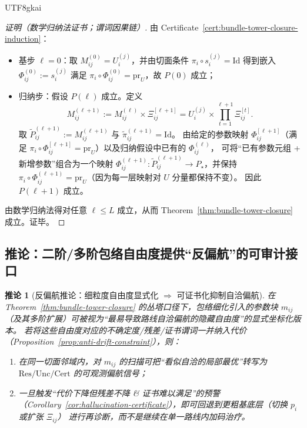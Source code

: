 \documentclass[12pt]{article}
\newtheorem{corollary}{推论}[section]
\begin{document}
\begin{CJK*}{UTF8}{gkai}
\begin{proof}[证明（数学归纳法证书；谓词因果链）]
由 Certificate~\ref{cert:bundle-tower-closure-induction}：
\begin{itemize}
  \item 基步 $\ell=0$：取 $M_{ij}^{(0)}=U_i^{(j)}$，并由切面条件 $\pi_i\circ s_i^{(j)}=\mathrm{Id}$ 得到嵌入 $\Phi_{ij}^{(0)}:=s_i^{(j)}
    $ 满足 $\pi_i\circ \Phi_{ij}^{(0)}=\mathrm{pr}_{U}$，故 $P(0)$ 成立；
  \item 归纳步：假设 $P(\ell)$ 成立。定义
  \[
  M_{ij}^{(\ell+1)}:=M_{ij}^{(\ell)}\times \Xi_{ij}^{[\ell+1]}=U_i^{(j)}\times \prod_{t=1}^{\ell+1}\Xi_{ij}^{[t]}.
  \]
  取 $\tilde P_{ij}^{(\ell+1)}:=M_{ij}^{(\ell+1)}$ 与 $\tilde\pi_{ij}^{(\ell+1)}=\mathrm{Id}$。
  由给定的参数映射 $\Phi_{ij}^{[\ell+1]}$（满足 $\pi_i\circ \Phi_{ij}^{[\ell+1]}=\mathrm{pr}_{U}$）以及归纳假设中已有的 $\Phi_{ij}^{(\ell)}$，
    可将“已有参数元组 + 新增参数”组合为一个映射 $\Phi_{ij}^{(\ell+1)}:\tilde P_{ij}^{(\ell+1)}\to P_\star$，并保持 $\pi_i\circ\Phi_{ij}
    ^{(\ell+1)}=\mathrm{pr}_{U}$（因为每一层映射对 $U$ 分量都保持不变）。
  因此 $P(\ell+1)$ 成立。
\end{itemize}
由数学归纳法得对任意 $\ell\le L$ 成立，从而 Theorem~\ref{thm:bundle-tower-closure} 成立。证毕。
\end{proof}

\subsection{推论：二阶/多阶包络自由度提供“反偏航”的可审计接口}

\begin{corollary}[反偏航推论：细粒度自由度显式化 $\Rightarrow$ 可证书化抑制自洽偏航]
\label{cor:envelope-anti-drift}
在 Theorem~\ref{thm:bundle-tower-closure} 的丛塔口径下，包络细化引入的参数块 $m_{ij}$（及其多阶扩展）可被视为“最易导致路线自洽偏航的隐藏自由度”的显式坐标化版本。
若将这些自由度对应的不确定度/残差/证书谓词一并纳入代价（Proposition~\ref{prop:anti-drift-constraint}），则：
\begin{enumerate}
  \item 在同一切面邻域内，对 $m_{ij}$ 的扫描可把“看似自洽的局部最优”转写为 $\mathrm{Res}/\mathrm{Unc}/\mathrm{Cert}$ 的可观测偏航信号；
  \item 一旦触发“代价下降但残差不降 \& 证书难以满足”的预警（Corollary~\ref{cor:hallucination-certificate}），即可回退到更粗基底层（切换 $p_i$ 或扩张 $\Xi_{ij}$）
    进行再诊断，而不是继续在单一路线内加码治疗。
\end{enumerate}
\end{corollary}


\end{CJK*}
\end{document}

